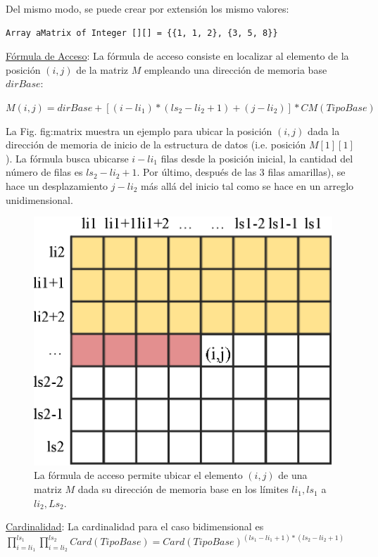 Del mismo modo, se puede crear por extensión los mismo valores:

\begin{lstlisting}[upquote=true, language=pseudo]
Array aMatrix of Integer [][] = {{1, 1, 2}, {3, 5, 8}}
\end{lstlisting}

\underline{Fórmula de Acceso}: La fórmula de acceso consiste en localizar al elemento de la posición $(i,j)$ de la matriz $M$ empleando una dirección de memoria base $dirBase$:

$M(i,j) = dirBase + [(i - li_1)*(ls_2 - li_2 + 1) + (j - li_2)] * CM(TipoBase)$

La Fig. {fig:matrix} muestra un ejemplo para ubicar la posición $(i,j)$ dada la dirección de memoria de inicio de la estructura de datos (i.e. posición $M[1][1]$). La fórmula busca ubicarse $i - li_1$ filas desde la posición inicial, la cantidad del número de filas es $ls_2 - li_2 + 1$. Por último, después de las 3 filas amarillas), se hace un desplazamiento $j - li_2$ más allá del inicio tal como se hace en un arreglo unidimensional.

\begin{figure}[!htb]
\centering
\includegraphics[scale=.7]{images/matriz.eps}
\caption{La fórmula de acceso permite ubicar el elemento $(i,j)$ de una matriz $M$ dada su dirección de memoria base en los límites $li_1,ls_1$ a $li_2,Ls_2$.}
\label{fig:matrix}
\end{figure}

\underline{Cardinalidad}: La cardinalidad para el caso bidimensional es $\prod_{i=li_1}^{ls_1}{\prod_{i=li_2}^{ls_2}{Card(TipoBase)}} = Card(TipoBase)^{(ls_1-li_1+1)*(ls_2-li_2+1)}$

